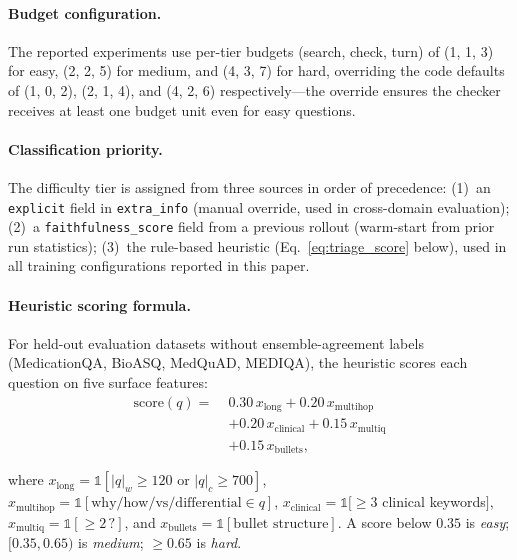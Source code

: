 \documentclass[11pt]{article}
\begin{document}
\paragraph{Budget configuration.}
The reported experiments use per-tier budgets 
(search, check, turn) of (1, 1, 3) for easy, 
(2, 2, 5) for medium, and (4, 3, 7) for hard, 
overriding the code defaults of (1, 0, 2), 
(2, 1, 4), and (4, 2, 6) respectively---the 
override ensures the checker receives at least 
one budget unit even for easy questions.

\paragraph{Classification priority.}
The difficulty tier is assigned from three sources
in order of precedence:
(1)~an \texttt{explicit} field in \texttt{extra\_info}
(manual override, used in cross-domain evaluation);
(2)~a \texttt{faithfulness\_score} field from a
previous rollout (warm-start from prior run statistics);
(3)~the rule-based heuristic (Eq.~\ref{eq:triage_score}
below), used in all training configurations reported in
this paper.

\paragraph{Heuristic scoring formula.}
For held-out evaluation datasets without
ensemble-agreement labels (MedicationQA, BioASQ,
MedQuAD, MEDIQA), the heuristic scores each question on
five surface features:
\begin{equation}
\begin{split}
\text{score}(q) = \;& 0.30\,x_{\text{long}}
                 + 0.20\,x_{\text{multihop}} \\
                 & + 0.20\,x_{\text{clinical}}
                 + 0.15\,x_{\text{multiq}} \\
                 & + 0.15\,x_{\text{bullets}},
\end{split}
\label{eq:triage_score}
\end{equation}

where $x_{\text{long}} = \mathbb{1}[|q|_w \geq 120
\text{ or } |q|_c \geq 700]$,
$x_{\text{multihop}} = \mathbb{1}[\text{why/how/vs}
/\text{differential} \in q]$,
$x_{\text{clinical}} = \mathbb{1}[\geq\!3$ clinical
keywords$]$,
$x_{\text{multiq}} = \mathbb{1}[\geq\!2\,\text{?}]$,
and $x_{\text{bullets}} = \mathbb{1}[\text{bullet
structure}]$.
A score below $0.35$ is \textit{easy}; $[0.35, 0.65)$
is \textit{medium}; $\geq 0.65$ is \textit{hard}.
\end{document}
